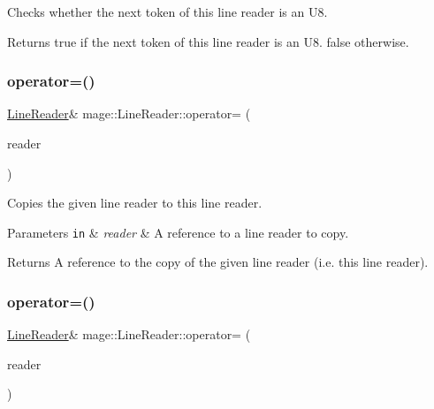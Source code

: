 Checks whether the next token of this line reader is an {\ttfamily U8}.

\begin{DoxyReturn}{Returns}
{\ttfamily true} if the next token of this line reader is an {\ttfamily U8}. {\ttfamily false} otherwise. 
\end{DoxyReturn}
\hypertarget{classmage_1_1_line_reader_a2247078d0b5602f9a9a6b74019832faf}{}\label{classmage_1_1_line_reader_a2247078d0b5602f9a9a6b74019832faf} 
\subsubsection{\texorpdfstring{operator=()}{operator=()}\hspace{0.1cm}{\footnotesize\ttfamily [1/2]}}
{\footnotesize\ttfamily \hyperlink{classmage_1_1_line_reader}{Line\+Reader}\& mage\+::\+Line\+Reader\+::operator= (\begin{DoxyParamCaption}\item[{const \hyperlink{classmage_1_1_line_reader}{Line\+Reader} \&}]{reader }\end{DoxyParamCaption})\hspace{0.3cm}{\ttfamily [delete]}}

Copies the given line reader to this line reader.


\begin{DoxyParams}[1]{Parameters}
\mbox{\tt in}  & {\em reader} & A reference to a line reader to copy. \\
\hline
\end{DoxyParams}
\begin{DoxyReturn}{Returns}
A reference to the copy of the given line reader (i.\+e. this line reader). 
\end{DoxyReturn}
\hypertarget{classmage_1_1_line_reader_a45504c0ba4238eedf851cfb9df081a01}{}\label{classmage_1_1_line_reader_a45504c0ba4238eedf851cfb9df081a01} 
\subsubsection{\texorpdfstring{operator=()}{operator=()}\hspace{0.1cm}{\footnotesize\ttfamily [2/2]}}
{\footnotesize\ttfamily \hyperlink{classmage_1_1_line_reader}{Line\+Reader}\& mage\+::\+Line\+Reader\+::operator= (\begin{DoxyParamCaption}\item[{\hyperlink{classmage_1_1_line_reader}{Line\+Reader} \&\&}]{reader }\end{DoxyParamCaption})\hspace{0.3cm}{\ttfamily [delete]}}

